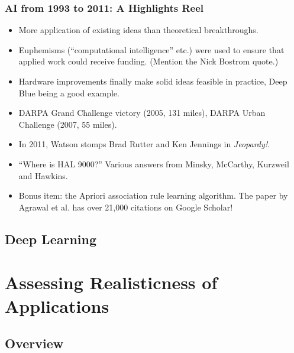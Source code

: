 \documentclass[10pt]{beamer}
\begin{document}
  \begin{frame}
    \frametitle{AI from 1993 to 2011: A Highlights Reel}

    \begin{itemize}
      \item More application of existing ideas than theoretical breakthroughs.
      \pause
      \item Euphemisms (``computational intelligence'' etc.) were used to
        ensure that applied work could receive funding. (Mention the Nick
        Bostrom quote.)
      \pause
      \item Hardware improvements finally make solid ideas feasible in
        practice, Deep Blue being a good example.
      \pause
      \item DARPA Grand Challenge victory (2005, 131 miles), DARPA Urban
        Challenge (2007, 55 miles).
      \pause
      \item In 2011, Watson stomps Brad Rutter and Ken Jennings in
        \textit{Jeopardy!}.
      \pause
      \item ``Where is HAL 9000?'' Various answers from Minsky, McCarthy,
        Kurzweil and Hawkins.
      \pause
      \item Bonus item: the Apriori association rule learning algorithm. The
        paper by Agrawal et al. has over 21,000 citations on Google Scholar!
    \end{itemize}
  \end{frame}


  \subsection{Deep Learning}

  \section{Assessing Realisticness of Applications}

  \subsection{Overview}
\end{document}
